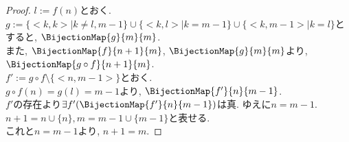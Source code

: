 \begin{proof}
$l:=f(n)$とおく.\\
$g:=\{<k,k> \mid k \neq l, m-1 \} \cup \{<k,l> \mid k = m-1 \} \cup \{<k,m-1> \mid k = l \}$とすると,
$\BijectionMap{g}{m}{m}$.\\
また,
$\BijectionMap{f}{n+1}{m}$,
$\BijectionMap{g}{m}{m}$より,
$\BijectionMap{g \circ f}{n+1}{m}$.\\
$f':= g \circ f \setminus \{<n, m-1>\}$とおく.\\
$g \circ f(n) = g(l) = m-1$より,
$\BijectionMap{f'}{n}{m-1}$.\\
$f'$の存在より$\exists f'(\BijectionMap{f'}{n}{m-1})$は真.
ゆえに$n = m-1$.\\
$n+1=n \cup \{n\}, m=m-1 \cup \{m-1\}$と表せる.\\
これと$n=m-1$より,
$n+1=m$.
\end{proof}
